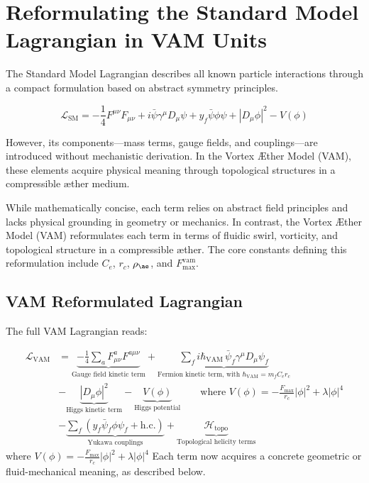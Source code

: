 \section{Reformulating the Standard Model Lagrangian in VAM Units}\label{sec:lagrangian_vam}
The Standard Model Lagrangian describes all known particle interactions through a compact formulation based on abstract symmetry principles.

\begin{equation}
\mathcal{L}_{\text{SM}} = -\frac{1}{4}F^{\mu\nu}F_{\mu\nu} + i\bar{\psi}\gamma^\mu D_\mu \psi + y_f \bar{\psi}\phi \psi + |D_\mu \phi|^2 - V(\phi)
\end{equation}

However, its components—mass terms, gauge fields, and couplings—are introduced without mechanistic derivation. In the Vortex Æther Model (VAM), these elements acquire physical meaning through topological structures in a compressible æther medium.

While mathematically concise, each term relies on abstract field principles and lacks physical grounding in geometry or mechanics. In contrast, the Vortex Æther Model (VAM) reformulates each term in terms of fluidic swirl, vorticity, and topological structure in a compressible æther. The core constants defining this reformulation include \( C_e \), \( r_c \), \( \rho_{\ae} \), and \( F^{\text{vam}}_\text{max} \).

\subsection*{VAM Reformulated Lagrangian}

The full VAM Lagrangian reads:

\begin{align*}
    \mathcal{L}_\text{VAM} &= \underbrace{-\frac{1}{4} \sum_{a} F^{a}_{\mu\nu} F^{a\mu\nu}}_{\text{Gauge field kinetic term}}
    + \underbrace{\sum_{f} i \hbar_\text{VAM} \, \bar{\psi}_f \gamma^\mu D_\mu \psi_f}_{\text{Fermion kinetic term, with } \hbar_\text{VAM} = m_f C_e r_c}\\
    &- \underbrace{\left| D_\mu \phi \right|^2}_{\text{Higgs kinetic term}}
    - \underbrace{V(\phi)}_{\text{Higgs potential}}  \qquad \text{where } V(\phi) = -\frac{F_\text{max}}{r_c}|\phi|^2 + \lambda |\phi|^4 \\
    &- \underbrace{\sum_f \left(y_f \bar{\psi}_f \phi \psi_f + \text{h.c.}\right)}_{\text{Yukawa couplings}}
    + \underbrace{\mathcal{H}_\text{topo}}_{\text{Topological helicity terms}}
\end{align*}
where $ V(\phi) = -\frac{F_\text{max}}{r_c}|\phi|^2 + \lambda |\phi|^4$
Each term now acquires a concrete geometric or fluid-mechanical meaning, as described below.

